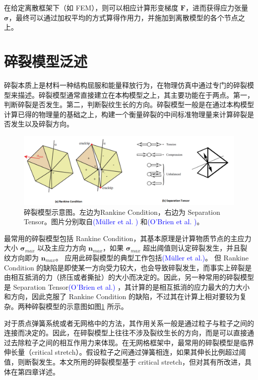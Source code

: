 在给定离散框架下（如 FEM），则可以相应计算形变梯度 $\textbf{F}$，进而获得应力张量 $\mathbf{\sigma}$，最终可以通过加权平均的方式算得作用力，并施加到离散模型的各个节点之上。

\section{碎裂模型泛述}
\label{fracture_model_section}

碎裂本质上是材料一种结构屈服和能量释放行为，在物理仿真中通过专门的碎裂模型来描述。碎裂模型通常直接建立在本构模型之上，其主要功能在于两点。第一，判断碎裂是否发生。第二，判断裂纹生长的方向。碎裂模型一般是在通过本构模型计算已得的物理量的基础之上，构建一个衡量碎裂的中间标准物理量来计算碎裂是否发生以及碎裂方向。

\begin{figure}[!htb]
  \centering
  \captionsetup{justification=centering}
  \includegraphics[width=\linewidth]{chap/image/fracture_model}

  \caption{\label{fracture_model}
           碎裂模型示意图。左边为Rankine Condition，右边为 Separation Tensor。图片分别取自\textcolor{blue}{(M\"{u}ller et al. )\parencite{Muller2004}} 和\textcolor{blue}{(O'Brien et al. )\parencite{OBrien1999}}。
          }
\end{figure}

最常用的碎裂模型包括 Rankine Condition，其基本原理是计算物质节点的主应力大小 $\mathbf{\sigma}_{max}$ 以及主应力方向 $\textbf{n}_{max}$，如果 $\mathbf{\sigma}_{max}$ 超出阈值则认定碎裂发生，并且裂纹方向即为 $\textbf{n}_{max}$。 应用此碎裂模型的典型工作包括\textcolor{blue}{(M\"{u}ller et al.)\parencite{Muller2004}}。 但 Rankine Condition 的缺陷是即使某一方向受力较大，也会导致碎裂发生，而事实上碎裂是由相互抵消的力（挤压或者撕扯）的大小而决定的。因此，另一种常用的碎裂模型是 Separation Tensor\textcolor{blue}{(O'Brien et al.)\parencite{OBrien1999}} ，其计算的是相互抵消的应力最大的力大小和方向，因此克服了 Rankine Condition 的缺陷，不过其在计算上相对要较为复杂。两种碎裂模型的示意图如图\ref{fracture_model} 所示。

对于质点弹簧系统或者无网格中的方法，其作用关系一般是通过粒子与粒子之间的连接而决定的。因此，在碎裂模型上往往不涉及裂纹生长的方向，而是可以直接通过去除粒子之间的相互作用力来体现。在无网格框架中，最常用的碎裂模型是临界伸长量（critical stretch）。假设粒子之间通过弹簧相连，如果其伸长比例超过阈值，则断裂发生。本文所用的碎裂模型基于 critical stretch，但对其有所改进，具体在第四章详述。

